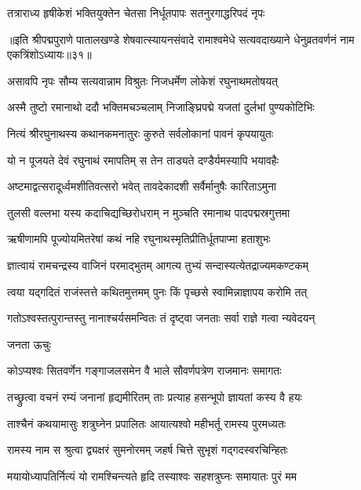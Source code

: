 \twolineshloka
{तत्राराध्य हृषीकेशं भक्तियुक्तेन चेतसा}
{निर्धूतपापः सतनुरगाद्धरिपदं नृपः}%

॥इति श्रीपद्मपुराणे पातालखण्डे शेषवात्स्यायनसंवादे रामाश्वमेधे सत्यवदाख्याने धेनुव्रतवर्णनं नाम एकत्रिंशोऽध्यायः॥३१॥



\twolineshloka
{असावपि नृपः सौम्य सत्यवान्नाम विश्रुतः}
{निजधर्मेण लोकेशं रघुनाथमतोषयत्}%

\twolineshloka
{अस्मै तुष्टो रमानाथो ददौ भक्तिमचञ्चलाम्}
{निजाङ्घ्रिपद्मे यजतां दुर्लभां पुण्यकोटिभिः}%

\twolineshloka
{नित्यं श्रीरघुनाथस्य कथानकमनातुरः}
{कुरुते सर्वलोकानां पावनं कृपयायुतः}%

\twolineshloka
{यो न पूजयते देवं रघुनाथं रमापतिम्}
{स तेन ताड्यते दण्डैर्यमस्यापि भयावहैः}%

\twolineshloka
{अष्टमाद्वत्सरादूर्ध्वमशीतिवत्सरो भवेत्}
{तावदेकादशी सर्वैर्मानुषैः कारिताऽमुना}%

\twolineshloka
{तुलसी वल्लभा यस्य कदाचिद्यच्छिरोधराम्}
{न मुञ्चति रमानाथ पादपद्मस्रगुत्तमा}%

\twolineshloka
{ऋषीणामपि पूज्योयमितरेषां कथं नहि}
{रघुनाथस्मृतिप्रीतिर्धूतपाप्मा हताशुभः}%

\twolineshloka
{ज्ञात्वायं रामचन्द्रस्य वाजिनं परमाद्भुतम्}
{आगत्य तुभ्यं सन्दास्यत्येतद्राज्यमकण्टकम्}%

\twolineshloka
{त्वया यद्गदितं राजंस्तत्ते कथितमुत्तमम्}
{पुनः किं पृच्छसे स्वामिन्नाज्ञापय करोमि तत्}%


\twolineshloka
{गतोऽश्वस्तत्पुरान्तस्तु नानाश्चर्यसमन्वितः}
{तं दृष्ट्वा जनताः सर्वा राज्ञे गत्वा न्यवेदयन्}%

जनता ऊचुः

\twolineshloka
{कोऽप्यश्वः सितवर्णेन गङ्गाजलसमेन वै}
{भाले सौवर्णपत्रेण राजमानः समागतः}%

\twolineshloka
{तच्छ्रुत्वा वचनं रम्यं जनानां हृद्यमीरितम्}
{ताः प्रत्याह हसन्भूपो ज्ञायतां कस्य वै हयः}%

\twolineshloka
{ताश्चैनं कथयामासुः शत्रुघ्नेन प्रपालितः}
{आयात्यश्वो महीभर्तू रामस्य पुरमध्यतः}%

\twolineshloka
{रामस्य नाम स श्रुत्वा द्व्यक्षरं सुमनोरमम्}
{जहर्ष चित्ते सुभृशं गद्गदस्वरचिन्हितः}%

\twolineshloka
{मयायोध्यापतिर्नित्यं यो रामश्चिन्त्यते हृदि}
{तस्याश्वः सहशत्रुघ्नः समायातः पुरं मम}%

